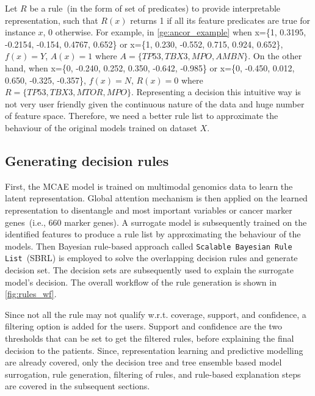 \hspace*{3.5mm} Let $R$ be a rule~(in the form of set of predicates) to provide interpretable representation, such that $R(x)$ returns 1 if all its feature predicates are true for instance $x$, 0 otherwise. For example, in \cref{ge:ancor_example} when x=\{1, 0.3195, -0.2154, -0.154, 0.4767, 0.652\} or x=\{1, 0.230, -0.552, 0.715, 0.924, 0.652\}, $f(x)=Y$, $A(x)=1$ where $A=\{TP53, TBX3, MPO, AMBN\}$. On the other hand, when x=\{0, -0.240, 0.252, 0.350, -0.642, -0.985\} or x=\{0, -0.450, 0.012, 0.650, -0.325, -0.357\}, $f(x)=N$, $R(x)=0$ where $R=\{TP53, TBX3, MTOR, MPO\}$. Representing a decision this intuitive way is not very user friendly given the continuous nature of the data and huge number of feature space. Therefore, we need a better rule list to approximate the behaviour of the original models trained on dataset $X$. 

\subsection{Generating decision rules}
First, the MCAE model is trained on multimodal genomics data to learn the latent representation. Global attention mechanism is then applied on the learned representation to disentangle and most important variables or cancer marker genes~(i.e., 660 marker genes). A surrogate model is subsequently trained on the identified features to produce a rule list by approximating the behaviour of the  models. Then Bayesian rule-based approach called \texttt{Scalable Bayesian Rule List}~(SBRL) is employed to solve the overlapping decision rules and generate decision set. The decision sets are subsequently used to explain the surrogate model's decision. The overall workflow of the rule generation is shown in \cref{fig:rules_wf}.

\hspace*{3.5mm} Since not all the rule may not qualify w.r.t. coverage, support, and confidence, a filtering option is added for the users. Support and confidence are the two thresholds that can be set to get the filtered rules, before explaining the final decision to the patients. Since, representation learning and predictive modelling are already covered, only the decision tree and tree ensemble based model surrogation, rule generation, filtering of rules, and rule-based explanation steps are covered in the subsequent sections. 

